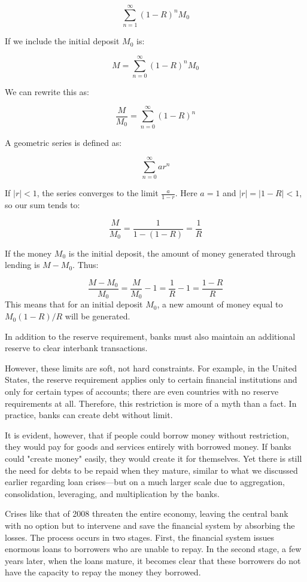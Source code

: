 $$\sum_{n=1}^{\infty} (1 - R)^n M_0$$

If we include the initial deposit $M_0$ is:

$$M = \sum_{n=0}^{\infty} (1 - R)^n M_0$$

We can rewrite this as:

$$\frac{M}{M_0} = \sum_{n=0}^{\infty} (1 - R)^n$$

A geometric series is defined as: %

$$\sum_{n=0}^{\infty} a r^n$$

If $|r| < 1$, the series converges to the limit $\frac{a}{1 - r}$.  Here $a = 1$ and $|r| = |1 - R| < 1$, so our sum tends to:

$$\frac{M}{M_0} = \frac{1}{1 - (1 - R)} = \frac{1}{R}$$

If the money $M_0$ is the initial deposit, the amount of money generated through lending is $M - M_0$.  Thus:

$$\frac{M - M_0}{M_0} = \frac{M}{M_0} - 1 = \frac{1}{R} - 1 = \frac{1 - R}{R}$$
This means that for an initial deposit $M_0$, a new amount of money equal to $M_0 (1 - R) / R$ will be generated.

In addition to the reserve requirement, banks must also maintain an additional reserve to clear interbank transactions.

However, these limits are soft, not hard constraints. For example, in the United States, the reserve requirement applies only to certain financial institutions and only for certain types of accounts; there are even countries with no reserve requirements at all. Therefore, this restriction is more of a myth than a fact. In practice, banks can create debt without limit.

It is evident, however, that if people could borrow money without restriction, they would pay for goods and services entirely with borrowed money. If banks could "create money" easily, they would create it for themselves. Yet there is still the need for debts to be repaid when they mature, similar to what we discussed earlier regarding loan crises—but on a much larger scale due to aggregation, consolidation, leveraging, and multiplication by the banks.

Crises like that of 2008 threaten the entire economy, leaving the central bank with no option but to intervene and save the financial system by absorbing the losses. The process occurs in two stages. First, the financial system issues enormous loans to borrowers who are unable to repay. In the second stage, a few years later, when the loans mature, it becomes clear that these borrowers do not have the capacity to repay the money they borrowed.

